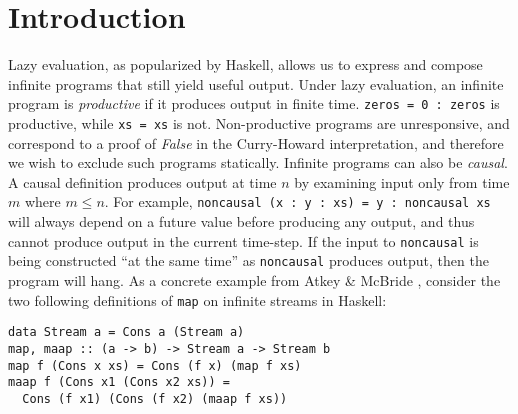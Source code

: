 \documentclass[sigplan,9pt,review]{acmart}\settopmatter{printfolios=true,printccs=false,printacmref=false}
\newcommand{\code}[1]{\texttt{#1}}
\begin{document}


\maketitle


\section{Introduction}
Lazy evaluation, as popularized by Haskell, allows us to express and
compose infinite programs that still yield useful output. Under lazy evaluation, an infinite program is
\emph{productive} if it produces output in finite time. \code{zeros = 0 : zeros} is productive, while \code{xs = xs} is
not. Non-productive programs are unresponsive, and correspond to a proof of \textit{False} in the Curry-Howard
interpretation, and therefore we wish to exclude such programs statically. Infinite programs can
also be \emph{causal}. A causal definition produces output at time $n$ by examining input only
from time $m$ where $m ≤ n$.
For example, \code{noncausal (x : y : xs) = y : noncausal xs}
will always depend on a future value before producing any output, and thus
cannot produce output in the current time-step. If the input to \code{noncausal} is being
constructed ``at the same time'' as \code{noncausal} produces output, then the program will
hang. As a concrete example from Atkey \& McBride \cite{atkey2013productive}, consider the two following
definitions of \code{map} on infinite streams in Haskell:

\begin{verbatim}
data Stream a = Cons a (Stream a)
map, maap :: (a -> b) -> Stream a -> Stream b
map f (Cons x xs) = Cons (f x) (map f xs)
maap f (Cons x1 (Cons x2 xs)) =
  Cons (f x1) (Cons (f x2) (maap f xs))
\end{verbatim}
\end{document}
